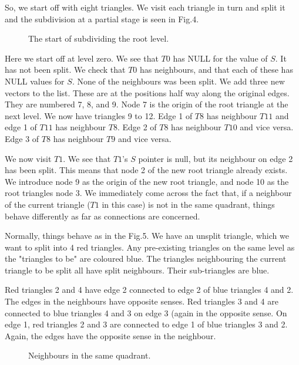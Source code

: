 \documentclass[12pt]{article}
\begin{document}
So, we start off with eight triangles. We visit each triangle in turn and split it
and the subdivision at a partial stage  is seen in Fig.4.
     \vspace*{10cm}
     \begin{figure}[htb]
     \caption{ 
	     The start of subdividing the root level.
     }
\end{figure}
Here we start off at level zero. We see that $T0$ has NULL for the value of $S$.
It has not been split. We check that $T0$ has neighbours, and that each of these
has NULL values for $S$. None of the neighbours was been split. We add three new
vectors to the list. These are at the positions half way along the original
edges. They are numbered 7, 8, and 9. Node 7 is the origin of the root triangle 
at the next level. We now have triangles 9 to 12. 
Edge 1 of $T8$ has neighbour 
$T11$ and edge 1 of $T11$ has neighbour $T8$.
Edge 2 of $T8$ has neighbour $T10$ and vice versa.
Edge 3 of $T8$ has neighbour $T9$ and vice versa.

We now visit $T1$. We see that $T1$'s $S$ pointer is null, but its neighbour
on edge 2 has been split. This means that node 2 of the new root triangle already
exists. We introduce node 9 as the origin of the new root triangle, and node 10
as the root triangles node 3. We immediately come across the fact that, if a
neighbour of the current triangle ($T1$ in this case) is not in the same quadrant,
 things behave differently as far as connections are concerned.

Normally, things behave as in the Fig.5. We have an unsplit triangle,
which we want to split into 4 red triangles. Any pre-existing triangles on 
the same level as the "triangles to be" are coloured blue. The triangles
neighbouring the current triangle to be split all have split neighbours.
Their sub-triangles are blue.

 Red triangles
2 and 4  have edge 2 connected to edge 2 of blue triangles 4 and 2.
The edges in the neighbours have opposite senses.
 Red triangles 3 and 4 are connected to blue
triangles 4 and 3 on edge 3 (again in the opposite sense. 
On edge 1, red triangles 2 and 3 are connected to edge 1 of blue triangles 3 and 2.
Again, the edges have the opposite sense in the neighbour.
\vspace*{10cm}
\begin{figure}[htb]
\caption{ 
Neighbours in the same quadrant.
}
\end{figure}
\end{document}
